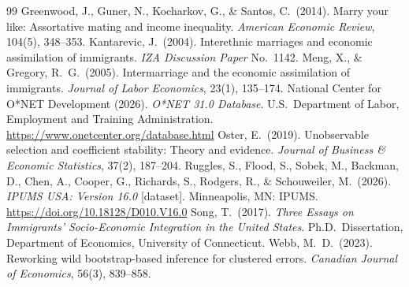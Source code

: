 \documentclass[11pt]{article}
\begin{document}
\begin{thebibliography}{99}
 Greenwood, J., Guner, N., Kocharkov, G., \& Santos, C.\ (2014). Marry your like: Assortative mating and income inequality. \textit{American Economic Review}, 104(5), 348--353.
 Kantarevic, J.\ (2004). Interethnic marriages and economic assimilation of immigrants. \textit{IZA Discussion Paper} No.~1142.
 Meng, X., \& Gregory, R.~G.\ (2005). Intermarriage and the economic assimilation of immigrants. \textit{Journal of Labor Economics}, 23(1), 135--174.
 National Center for O*NET Development (2026). \textit{O*NET 31.0 Database}. U.S.\ Department of Labor, Employment and Training Administration. \url{https://www.onetcenter.org/database.html}
 Oster, E.\ (2019). Unobservable selection and coefficient stability: Theory and evidence. \textit{Journal of Business \& Economic Statistics}, 37(2), 187--204.
 Ruggles, S., Flood, S., Sobek, M., Backman, D., Chen, A., Cooper, G., Richards, S., Rodgers, R., \& Schouweiler, M.\ (2026). \textit{IPUMS USA: Version 16.0} [dataset]. Minneapolis, MN: IPUMS. \url{https://doi.org/10.18128/D010.V16.0}
 Song, T.\ (2017). \textit{Three Essays on Immigrants' Socio-Economic Integration in the United States}. Ph.D.\ Dissertation, Department of Economics, University of Connecticut.
 Webb, M.~D.\ (2023). Reworking wild bootstrap-based inference for clustered errors. \textit{Canadian Journal of Economics}, 56(3), 839--858.
\end{thebibliography}
\end{document}

